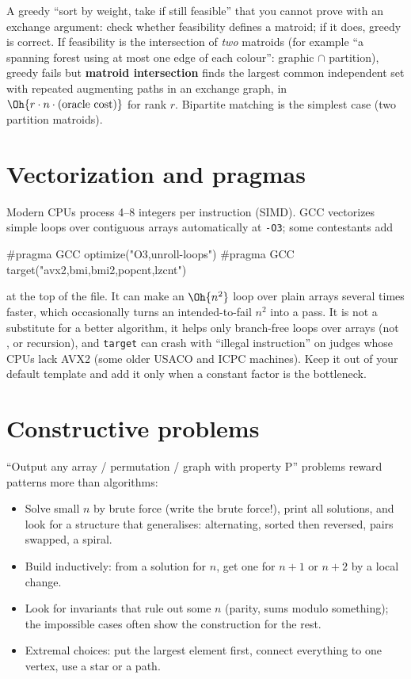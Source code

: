\begin{recognize}
A greedy ``sort by weight, take if still feasible'' that you cannot prove with an exchange argument: check whether feasibility
defines a matroid; if it does, greedy is correct. If feasibility is the intersection of \emph{two} matroids (for example ``a
spanning forest using at most one edge of each colour'': graphic $\cap$ partition), greedy fails but \textbf{matroid
intersection} finds the largest common independent set with repeated augmenting paths in an exchange graph, in
$\Oh{r\cdot n\cdot(\text{oracle cost})}$ for rank $r$. Bipartite matching is the simplest case (two partition matroids).
\end{recognize}

\section[Vectorization and pragmas]{Vectorization and pragmas \hfill \ioi}

Modern CPUs process 4--8 integers per instruction (SIMD). GCC vectorizes simple loops over contiguous arrays automatically at
\texttt{-O3}; some contestants add
\begin{code}
#pragma GCC optimize("O3,unroll-loops")
#pragma GCC target("avx2,bmi,bmi2,popcnt,lzcnt")
\end{code}
at the top of the file. It can make an $\Oh{n^2}$ loop over plain arrays several times faster, which occasionally turns an
intended-to-fail $n^2$ into a pass. It is not a substitute for a better algorithm, it helps only branch-free loops over arrays
(not ,  or recursion), and \texttt{target} can crash with ``illegal instruction'' on judges whose CPUs lack AVX2
(some older USACO and ICPC machines). Keep it out of your default template and add it only when a constant factor is the
bottleneck.

\section[Constructive problems]{Constructive problems \hfill \silver}

``Output any array / permutation / graph with property P'' problems reward patterns more than algorithms:

\begin{itemize}
  \item Solve small $n$ by brute force (write the brute force!), print all solutions, and look for a structure that
        generalises: alternating, sorted then reversed, pairs swapped, a spiral.
  \item Build inductively: from a solution for $n$, get one for $n + 1$ or $n + 2$ by a local change.
  \item Look for invariants that rule out some $n$ (parity, sums modulo something); the impossible cases often show the
        construction for the rest.
  \item Extremal choices: put the largest element first, connect everything to one vertex, use a star or a path.
\end{itemize}
